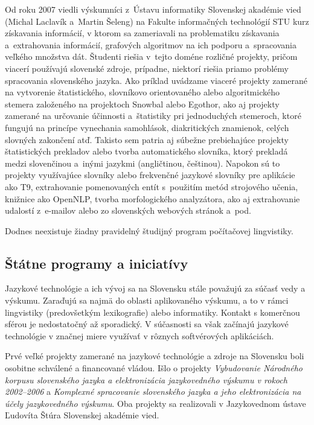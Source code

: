 \begin{multicols}{2}
Od roku 2007 viedli výskumníci z~Ústavu informatiky Slovenskej akadémie vied (Michal Laclavík a~Martin Šeleng) na Fakulte informačných technológií STU kurz získavania informácií, v ktorom sa zameriavali na problematiku získavania a~extrahovania informácií\cite{f30}, grafových algoritmov na ich podporu a~spracovania veľkého množstva dát. Študenti riešia v~tejto doméne rozličné projekty, pričom viacerí používajú slovenské zdroje, prípadne, niektorí riešia priamo problémy spracovania slovenského jazyka. Ako príklad uvádzame viaceré projekty zamerané na vytvorenie štatistického, slovníkovo orientovaného alebo algoritmického stemera založeného na projektoch Snowbal alebo Egothor, ako aj projekty zamerané na určovanie účinnosti a~štatistiky pri jednoduchých stemeroch, ktoré fungujú na princípe vynechania samohlások, diakritických znamienok, celých slovných zakončení atď. Takisto sem patria aj súbežne prebiehajúce projekty štatistických prekladov alebo tvorba automatického slovníka, ktorý prekladá medzi slovenčinou a~inými jazykmi (angličtinou, češtinou). Napokon sú to projekty využívajúce slovníky alebo frekvenčné jazykové slovníky pre aplikácie ako T9, extrahovanie pomenovaných entít s~použitím metód strojového učenia, knižnice ako OpenNLP, tvorba morfologického analyzátora, ako aj extrahovanie udalostí z~e-mailov alebo zo slovenských webových stránok a~pod.

Dodnes neexistuje žiadny pravidelný študijný program počítačovej lingvistiky.

\subsection{Štátne programy a iniciatívy}
Jazykové technológie a ich vývoj sa na Slovensku stále považujú za súčasť vedy a výskumu. Zaraďujú sa najmä do oblasti aplikovaného výskumu, a to v rámci lingvistiky (predovšetkým lexikografie) alebo informatiky. Kontakt s komerčnou sférou je nedostatočný až sporadický. V súčasnosti sa však začínajú jazykové technológie v značnej miere využívať v rôznych softvérových aplikáciách.

Prvé veľké projekty zamerané na jazykové technológie a zdroje na Slovensku boli osobitne schválené a financované vládou. Išlo o projekty \emph{Vybudovanie Národného korpusu slovenského jazyka a elektronizácia jazykovedného výskumu v rokoch 2002--2006} a \emph{Komplexné spracovanie slovenského jazyka a jeho elektronizácia na účely jazykovedného výskumu}. Oba projekty sa realizovali v Jazykovednom ústave Ľudovíta Štúra Slovenskej akadémie vied.


\end{multicols}
